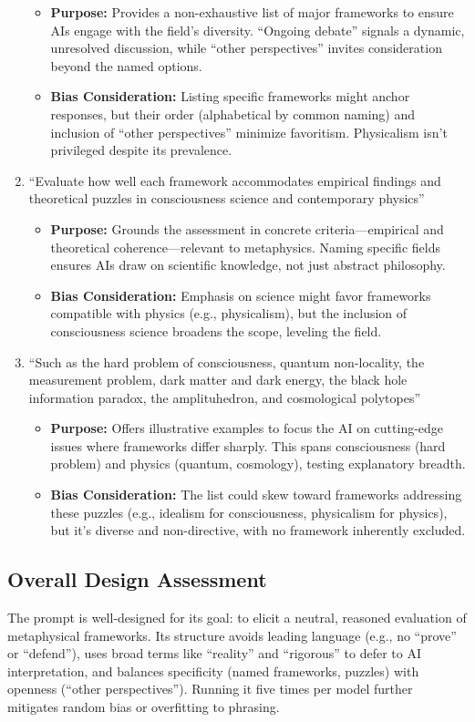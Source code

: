 \documentclass[11pt]{article}
\begin{document}
\begin{enumerate}
    \begin{itemize}
      \item \textbf{Purpose:} Provides a non-exhaustive list of major frameworks to ensure AIs engage with the field’s diversity. ``Ongoing debate'' signals a dynamic, unresolved discussion, while ``other perspectives'' invites consideration beyond the named options.
      \item \textbf{Bias Consideration:} Listing specific frameworks might anchor responses, but their order (alphabetical by common naming) and inclusion of ``other perspectives'' minimize favoritism. Physicalism isn’t privileged despite its prevalence.
    \end{itemize}
  \item ``Evaluate how well each framework accommodates empirical findings and theoretical puzzles in consciousness science and contemporary physics''
    \begin{itemize}
      \item \textbf{Purpose:} Grounds the assessment in concrete criteria---empirical and theoretical coherence---relevant to metaphysics. Naming specific fields ensures AIs draw on scientific knowledge, not just abstract philosophy.
      \item \textbf{Bias Consideration:} Emphasis on science might favor frameworks compatible with physics (e.g., physicalism), but the inclusion of consciousness science broadens the scope, leveling the field.
    \end{itemize}
  \item ``Such as the hard problem of consciousness, quantum non-locality, the measurement problem, dark matter and dark energy, the black hole information paradox, the amplituhedron, and cosmological polytopes''
    \begin{itemize}
      \item \textbf{Purpose:} Offers illustrative examples to focus the AI on cutting-edge issues where frameworks differ sharply. This spans consciousness (hard problem) and physics (quantum, cosmology), testing explanatory breadth.
      \item \textbf{Bias Consideration:} The list could skew toward frameworks addressing these puzzles (e.g., idealism for consciousness, physicalism for physics), but it’s diverse and non-directive, with no framework inherently excluded.
    \end{itemize}
\end{enumerate}

\subsection{Overall Design Assessment}
The prompt is well-designed for its goal: to elicit a neutral, reasoned evaluation of metaphysical frameworks. Its structure avoids leading language (e.g., no “prove” or “defend”), uses broad terms like “reality” and “rigorous” to defer to AI interpretation, and balances specificity (named frameworks, puzzles) with openness (“other perspectives”). Running it five times per model further mitigates random bias or overfitting to phrasing.
\end{document}
